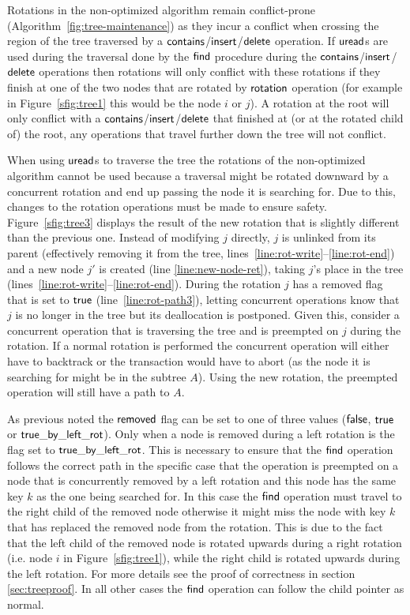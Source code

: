 Rotations in the non-optimized algorithm remain conflict-prone (Algorithm~\ref{fig:tree-maintenance}) as they incur a conflict when crossing the region of the tree traversed by a  $\act{contains}$/$\act{insert}$/$\act{delete}$ operation. 
If $\act{uread}$s are used during the traversal done by the $\act{find}$ procedure during the $\act{contains}$/$\act{insert}$/$\act{delete}$ operations then rotations will only conflict with these rotations if they
finish at one of the two nodes that are rotated by $\act{rotation}$ operation
(for example in Figure~\ref{sfig:tree1} this would be the node $i$ or $j$).
A rotation at the root will only conflict with a $\act{contains}$/$\act{insert}$/$\act{delete}$ that finished at (or at the rotated child of) the root, any operations that travel further down the tree will not conflict.

When using $\act{uread}$s to traverse the tree the rotations of the non-optimized algorithm cannot be used because a traversal
might be rotated downward by a concurrent rotation and end up passing the node it is searching for.
Due to this, changes to the rotation operations must be made to ensure safety.
Figure~\ref{sfig:tree3} displays the result of the new rotation that is slightly different than the previous one.
Instead of modifying $j$ directly, $j$ is unlinked from its parent (effectively removing it from the tree, lines~\ref{line:rot-write}--\ref{line:rot-end})
and a new node $j'$ is created (line \ref{line:new-node-ret}), taking $j$'s place in the tree (lines~\ref{line:rot-write}--\ref{line:rot-end}).
During the rotation $j$ has a removed flag that is set to $\lit{true}$ (line~\ref{line:rot-path3}), letting concurrent operations know that $j$ is no longer in the tree but its deallocation is postponed. 
Given this, consider a concurrent operation that is traversing the tree and is preempted on $j$ during the rotation.
If a normal rotation is performed the concurrent operation will either have to backtrack or the transaction would have to abort (as the node it is searching for might be in the subtree $A$).
Using the new rotation, the preempted operation will still have a path to $A$.

As previous noted the $\lit{removed}$ flag can be set to one of three values ($\lit{false}$, $\lit{true}$ or $\lit{true\_by\_left\_rot}$).
Only when a node is removed during a left rotation is the flag set to $\lit{true\_by\_left\_rot}$.
This is necessary to ensure that the $\act{find}$ operation follows the correct path in the specific case that the operation is preempted on a node that is concurrently removed by a
left rotation and this node has the same key $k$ as the one being searched for.
In this case the $\act{find}$ operation must travel to the right child of the removed node otherwise it might miss the node with key $k$ that
has replaced the removed node from the rotation.
This is due to the fact that the left child of the removed node is rotated upwards during a right rotation (i.e. node $i$ in Figure~\ref{sfig:tree1}),
while the right child is rotated upwards during the left rotation.
For more details see the proof of correctness in section \ref{sec:treeproof}.
In all other cases the $\act{find}$ operation can follow the child pointer as normal.

